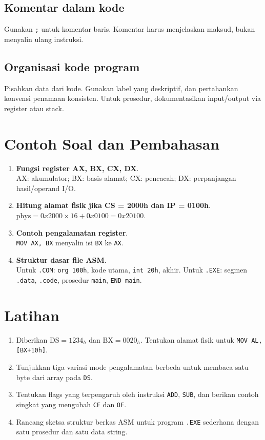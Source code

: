 \subsection{Komentar dalam kode}
Gunakan \texttt{;} untuk komentar baris. Komentar harus menjelaskan maksud, bukan menyalin ulang instruksi.

\subsection{Organisasi kode program}
Pisahkan data dari kode. Gunakan label yang deskriptif, dan pertahankan konvensi penamaan konsisten. Untuk prosedur, dokumentasikan input/output via register atau stack.

\section{Contoh Soal dan Pembahasan}
\begin{enumerate}
  \item \textbf{Fungsi register AX, BX, CX, DX}.\\ AX: akumulator; BX: basis alamat; CX: pencacah; DX: perpanjangan hasil/operand I/O.
  \item \textbf{Hitung alamat fisik jika CS = 2000h dan IP = 0100h}.\\ \(\text{phys} = 0x2000\times 16 + 0x0100 = 0x20100\).
  \item \textbf{Contoh pengalamatan register}.\\ \texttt{MOV AX, BX} menyalin isi \texttt{BX} ke \texttt{AX}.
  \item \textbf{Struktur dasar file ASM}.\\ Untuk \texttt{.COM}: \texttt{org 100h}, kode utama, \texttt{int 20h}, akhir. Untuk \texttt{.EXE}: segmen \texttt{.data}, \texttt{.code}, prosedur \texttt{main}, \texttt{END main}.
\end{enumerate}

\section{Latihan}
\begin{enumerate}
  \item Diberikan \(\text{DS}=1234_h\) dan \(\text{BX}=0020_h\). Tentukan alamat fisik untuk \texttt{MOV AL, [BX+10h]}.
  \item Tunjukkan tiga variasi mode pengalamatan berbeda untuk membaca satu byte dari array pada \texttt{DS}.
  \item Tentukan flags yang terpengaruh oleh instruksi \texttt{ADD}, \texttt{SUB}, dan berikan contoh singkat yang mengubah \texttt{CF} dan \texttt{OF}.
  \item Rancang sketsa struktur berkas ASM untuk program \texttt{.EXE} sederhana dengan satu prosedur dan satu data string.
\end{enumerate}

